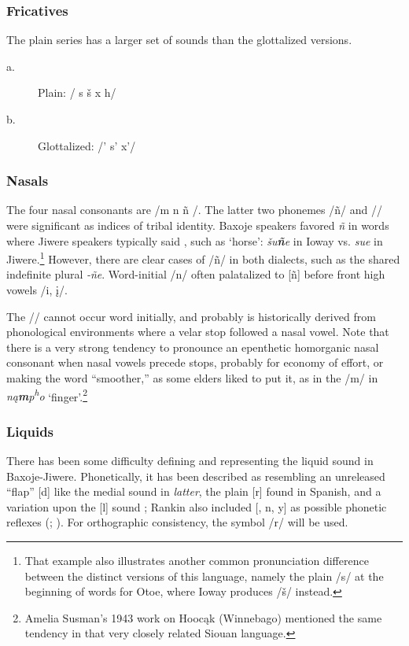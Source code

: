 \documentclass[output=paper]{LSP/langsci}
\begin{document}
\subsubsection{Fricatives}  The plain series has a larger set of sounds than the glottalized versions.  				
\begin{description}
\item[a.] Plain: 	  /  s  \v{s}  x   h/   								        	
\item[b.] Glottalized:  /'     s'    x'/	
\end{description}
 						    
\subsubsection{Nasals}  The four nasal consonants are /m n \~n /.  The latter two phonemes /\~n/ and // were significant as indices of tribal identity.  Baxoje speakers favored \textit{\~n} in words where Jiwere speakers typically said \textit{}, such as `horse': \textit{\v{s}u\textbf{\~n}e} in Ioway vs. \textit{su\textbf{}e} in Jiwere.\footnote{That example also illustrates another common pronunciation difference between the distinct versions of this language, namely the plain /s/ at the beginning of words for Otoe, where Ioway produces /\v{s}/ instead.}   However, there are clear cases of  /\~n/ in both dialects, such as the shared indefinite plural \textit{-\~ne}.  Word-initial /n/ often palatalized to [\~n] before front high vowels /i, \k{i}/.  

The // cannot occur word initially, and probably is historically derived from phonological environments where a velar stop followed a nasal vowel.  Note that there is a very strong tendency to pronounce an  epenthetic homorganic nasal consonant when nasal vowels precede stops, probably for economy of effort, or making the word ``smoother,'' as some elders liked to put it, as in the /m/ in \textit{n\k{a}\textbf{m}p\textsuperscript{h}o} `finger'.\footnote{Amelia Susman's 1943 work on Hooc\k{a}k (Winnebago) mentioned the same tendency in that very closely related Siouan language.}

\subsubsection{Liquids}  There has been some difficulty defining and representing the liquid sound in Baxoje-Jiwere.  Phonetically, it has been described as resembling an unreleased ``flap'' [d] like the medial sound in \textit{latter}, the plain [r] found in Spanish, and a variation upon the [l] sound \citep[235]{Whitman1947};  Rankin also included [, n, y] as possible phonetic reflexes (\citealt[346]{Wedel2001}; \citealt[447]{Schweitzer2001}). For orthographic consistency, the symbol /r/ will be used. 
\end{document}
